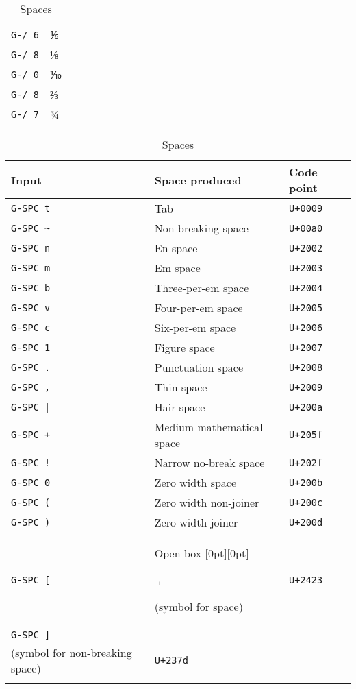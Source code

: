 \documentclass[oneside]{memoir}
\newcommand{\key}{\verb}
\newcommand{\out}[1]{\raisebox{0pt}[0pt][0pt]{\setlength{\fboxsep}{1pt}\colorbox{gray!20}{\strut{}#1}}}
\newcommand{\uni}[1]{\texttt{#1}}
\begin{document}
{{{\begin{table}
\begin{minipage}{0.25\paperwidth}
\begin{tabular}{ll}
\key|G-/ 6| & ⅙ \\
\key|G-/ 8| & ⅛ \\
\key|G-/ 0| & ⅒ \\
\key|G-/ 8| & ⅔ \\
\key|G-/ 7| & ¾ \\
\bottomrule
\end{tabular}
\end{minipage}\hfill
\begin{minipage}{0.5\paperwidth}
\caption{Spaces}
\label{tab:spaces}
\centering
\begin{tabular}{lll}
\toprule
Input     & Space produced                      & Code point \\
\midrule
\key|G-SPC t| & Tab                                 & \uni{U+0009} \\
\key|G-SPC ~| & Non-breaking space                  & \uni{U+00a0} \\
\key|G-SPC n| & En space                            & \uni{U+2002} \\
\key|G-SPC m| & Em space                            & \uni{U+2003} \\
\key|G-SPC b| & Three-per-em space                  & \uni{U+2004} \\
\key|G-SPC v| & Four-per-em space                   & \uni{U+2005} \\
\key|G-SPC c| & Six-per-em space                    & \uni{U+2006} \\
\key|G-SPC 1| & Figure space                        & \uni{U+2007} \\
\key|G-SPC .| & Punctuation space                   & \uni{U+2008} \\
\key|G-SPC ,| & Thin space                          & \uni{U+2009} \\
\key!G-SPC |! & Hair space                          & \uni{U+200a} \\
\key|G-SPC +| & Medium mathematical space           & \uni{U+205f} \\
\key|G-SPC !| & Narrow no-break space               & \uni{U+202f} \\
\key|G-SPC 0| & Zero width space                    & \uni{U+200b} \\
\key|G-SPC (| & Zero width non-joiner               & \uni{U+200c} \\
\key|G-SPC )| & Zero width joiner                   & \uni{U+200d} \\
\key|G-SPC [| & Open box \out{␣} (symbol for space) & \uni{U+2423} \\
\key|G-SPC ]|
  & \makecell{Shouldered open box \out{\tfbs{⍽}}\\\quad(symbol for non-breaking space)}
  & \uni{U+237d} \\
\bottomrule&&
\end{tabular}
\end{minipage}
\end{table}

}}}
\end{document}
